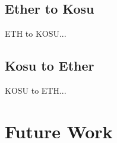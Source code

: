 \documentclass[10pt]{article}
\begin{document}
\subsection{Ether to Kosu}\label{token-distribution-eth-kosu}
ETH to KOSU...

\subsection{Kosu to Ether}\label{token-distribution-kosu-eth}
KOSU to ETH...\cite{bft}
\clearpage
\pagebreak


\section{Future Work}\label{future-work}

\clearpage
\pagebreak

\end{document}

